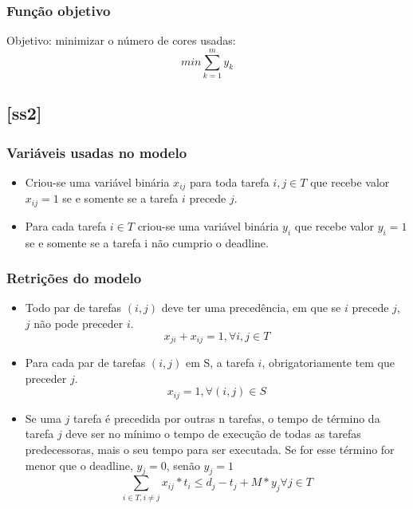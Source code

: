 \documentclass[11pt,letterpaper]{article}
\begin{document}
\subsubsection*{Função objetivo}
Objetivo: minimizar o número de cores usadas:
\begin{equation}
min\sum_{k=1}^{m}y_k
\end{equation}


\subsection{{[}ss2{]}}
\subsubsection*{Variáveis usadas no modelo}
\begin{itemize}
\item Criou-se uma variável binária $x_{ij}$ para toda tarefa $i, j
  \in T$ que recebe valor $x_{ij}=1$ se e somente se a
tarefa $i$ precede $j$.

\item Para cada tarefa $i \in T$ criou-se uma variável binária $y_{i}$
  que recebe valor $y_{i}=1$ se e somente se a tarefa i não cumprio o deadline.
\end{itemize}

\subsubsection*{Retrições do modelo}
\begin{itemize}

\item Todo par de tarefas $(i,j)$ deve ter uma precedência, em que se $i$
  precede $j$, $j$ não pode preceder $i$. 
\begin{equation*}
  x_{ji}+x_{ij}=1, \forall i,j \in T
\end{equation*}

\item Para cada par de tarefas $(i,j)$ em S, a tarefa $i$,
  obrigatoriamente tem que preceder $j$. 
\begin{equation*}
  x_{ij} = 1, \forall (i,j) \in S
\end{equation*}

\item Se uma $j$ tarefa é precedida por outras n tarefas, o tempo de
  término da tarefa $j$ deve ser no mínimo o tempo de execução de todas
  as tarefas predecessoras, mais o seu tempo para ser executada. Se
  for esse término for menor que o deadline, $y_{j}=0$, senão $y_{j}=1$ 
\begin{equation*}
 \sum_{i \in T, i \neq j} x_{ij}*t_{i} \leq d_{j}-t_{j}+ M*y_{j} \forall j \in T
\end{equation*}
 
\end{itemize}
\end{document}
